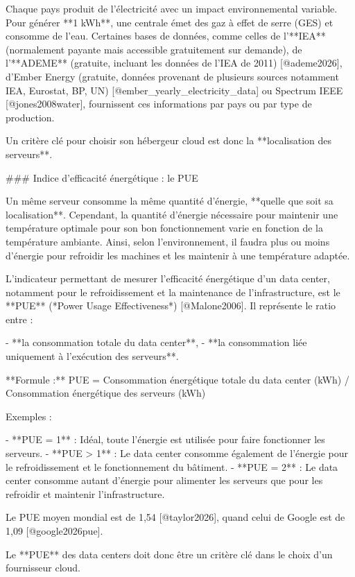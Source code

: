 Chaque pays produit de l'électricité avec un impact environnemental variable. Pour générer **1 kWh**, une centrale émet des gaz à effet de serre (GES) et consomme de l'eau. Certaines bases de données, comme celles de l'**IEA** (normalement payante mais accessible gratuitement sur demande), de l'**ADEME** (gratuite, incluant les données de l'IEA de 2011) [@ademe2026], d'Ember Energy (gratuite, données provenant de plusieurs sources notamment IEA, Eurostat, BP, UN) [@ember_yearly_electricity_data] ou Spectrum IEEE [@jones2008water], fournissent ces informations par pays ou par type de production.

Un critère clé pour choisir son hébergeur cloud est donc la **localisation des serveurs**.

### Indice d'efficacité énergétique : le PUE

Un même serveur consomme la même quantité d'énergie, **quelle que soit sa localisation**. Cependant, la quantité d'énergie nécessaire pour maintenir une température optimale pour son bon fonctionnement varie en fonction de la température ambiante. Ainsi, selon l'environnement, il faudra plus ou moins d'énergie pour refroidir les machines et les maintenir à une température adaptée.

L'indicateur permettant de mesurer l'efficacité énergétique d'un data center, notamment pour le refroidissement et la maintenance de l'infrastructure, est le **PUE** (*Power Usage Effectiveness*) [@Malone2006]. Il représente le ratio entre :

- **la consommation totale du data center**,
- **la consommation liée uniquement à l'exécution des serveurs**.

**Formule :** PUE = Consommation énergétique totale du data center (kWh) / Consommation énergétique des serveurs (kWh)

Exemples :

- **PUE = 1** : Idéal, toute l'énergie est utilisée pour faire fonctionner les serveurs.
- **PUE > 1** : Le data center consomme également de l'énergie pour le refroidissement et le fonctionnement du bâtiment.
- **PUE = 2** : Le data center consomme autant d'énergie pour alimenter les serveurs que pour les refroidir et maintenir l'infrastructure.

Le PUE moyen mondial est de 1,54 [@taylor2026], quand celui de Google est de 1,09 [@google2026pue].

Le **PUE** des data centers doit donc être un critère clé dans le choix d'un fournisseur cloud.

